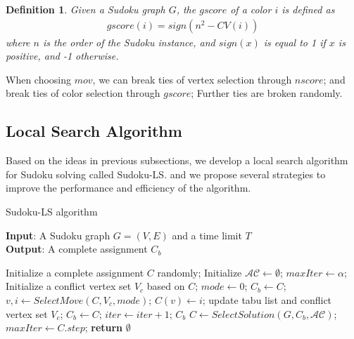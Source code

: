 \documentclass{article}
\newtheorem{Definition}{Definition}
\begin{document}
\begin{Definition}
Given a Sudoku graph $G$, the $gscore$ of a color $i$ is defined as 
\begin{align}
    gscore(i) = sign(n^2 - CV(i))
\end{align}%
where $n$ is the order of the Sudoku instance, and $sign(x)$ is equal to 1 if $x$ is positive, and -1 otherwise. 
\end{Definition}


When choosing $mov$, we can break ties of vertex selection through $nscore$; and break ties of color selection through $gscore$; Further ties are broken randomly. 

\subsection{Local Search Algorithm}

Based on the ideas in previous subsections, we develop a local search algorithm for Sudoku solving called Sudoku-LS. and we propose several strategies to improve the performance and efficiency of the algorithm.

\begin{algorithm}[t]
    \caption{Sudoku-LS algorithm}
    \label{alg:1}
    \textbf{Input}: A Sudoku graph $G = (V,E)$ and a time limit $T$\\
    \textbf{Output}: A complete assignment $C_b$
    \begin{algorithmic}[1] %
        \STATE Initialize a complete assignment $C$ randomly;
        \STATE Initialize $\mathcal{AC} \leftarrow \emptyset$;
        \STATE $maxIter \leftarrow \alpha$;
        \REPEAT
        \STATE Initialize a conflict vertex set $V_c$ based on $C$;
        \STATE $mode \leftarrow 0$; $C_b \leftarrow C$;
        \REPEAT
        \STATE $v,i \leftarrow SelectMove(C, V_c, mode)$; 
        \STATE $C(v) \leftarrow i$;
        \STATE update tabu list and conflict vertex set $V_c$;
        \STATE $C_b \leftarrow C$;
        \ENDIF
        \STATE $iter \leftarrow iter + 1$; 
        \RETURN $C_b$
        \ENDIF
        \STATE $C \leftarrow SelectSolution(G, C_b, \mathcal{AC})$;
        \STATE $maxIter \leftarrow C.step$;
        \STATE \textbf{return} $\emptyset$
    \end{algorithmic}
\end{algorithm}
\end{document}
